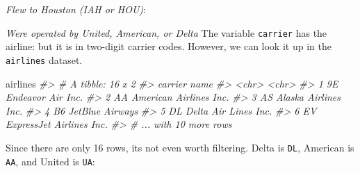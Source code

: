 \documentclass[]{book}
\newenvironment{Shaded}{\begin{snugshade}}{\end{snugshade}}
\newcommand{\CommentTok}[1]{\textcolor[rgb]{0.56,0.35,0.01}{\textit{#1}}}
\newcommand{\KeywordTok}[1]{\textcolor[rgb]{0.13,0.29,0.53}{\textbf{#1}}}
\newcommand{\NormalTok}[1]{#1}
\newcommand{\OperatorTok}[1]{\textcolor[rgb]{0.81,0.36,0.00}{\textbf{#1}}}
\newcommand{\StringTok}[1]{\textcolor[rgb]{0.31,0.60,0.02}{#1}}
\theoremstyle{definition}
\theoremstyle{definition}
\theoremstyle{definition}
\theoremstyle{remark}
\begin{document}
\emph{Flew to Houston (IAH or HOU)}:

\begin{Shaded}
\end{Shaded}

\emph{Were operated by United, American, or Delta} The variable
\texttt{carrier} has the airline: but it is in two-digit carrier codes.
However, we can look it up in the \texttt{airlines} dataset.

\begin{Shaded}
\begin{Highlighting}[]
\NormalTok{airlines}
\CommentTok{#> # A tibble: 16 x 2}
\CommentTok{#>   carrier name                    }
\CommentTok{#>   <chr>   <chr>                   }
\CommentTok{#> 1 9E      Endeavor Air Inc.       }
\CommentTok{#> 2 AA      American Airlines Inc.  }
\CommentTok{#> 3 AS      Alaska Airlines Inc.    }
\CommentTok{#> 4 B6      JetBlue Airways         }
\CommentTok{#> 5 DL      Delta Air Lines Inc.    }
\CommentTok{#> 6 EV      ExpressJet Airlines Inc.}
\CommentTok{#> # ... with 10 more rows}
\end{Highlighting}
\end{Shaded}

Since there are only 16 rows, its not even worth filtering. Delta is
\texttt{DL}, American is \texttt{AA}, and United is \texttt{UA}:
\end{document}
